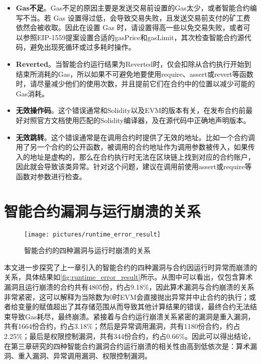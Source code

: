 \begin{itemize}
    \item \textbf{Gas不足}。Gas不足的原因主要是发送交易前设置的Gas太少，或者智能合约编写不当。若 Gas 设置得过低，会导致交易失败，且发送交易前支付的矿工费依然会被收取。因此在设置 Gas 时，请设置得高一些以免交易失败，或者可以参照EIP-1559提案\cite{EIP1559}设置合适的gasPrice和gasLimit，其次检查智能合约源代码，避免出现死循环或过多耗时操作。
    \item \textbf{Reverted}。当智能合约运行结果为Reverted时，仅会扣除从合约执行开始到结束所消耗的Gas，所以如果不可避免地要使用require、assert或revert等函数时，请尽量减少他们的使用次数，并且提前它们在合约中的位置以减少可能的Gas消耗。
    \item \textbf{无效操作码}。这个错误通常和Solidity以及EVM的版本有关，在发布合约前最好对照官方文档使用匹配的Solidity编译器，及在源代码中正确地声明版本。
    \item \textbf{无效跳转}。这个错误通常是在调用合约时提供了无效的地址。比如一个合约调用了另一个合约的公开函数，被调用的合约地址作为调用参数被传入，如果传入的地址是虚构的，那么在合约执行时无法在区块链上找到对应的合约账户，因此就会导致该类异常。针对这个问题，建议在调用前使用assert或require等函数对参数进行检查。
\end{itemize}

\section{智能合约漏洞与运行崩溃的关系}
\begin{figure}[htbp]
    \centering
    \texttt{[image: pictures/runtime\_error\_result]}
    \caption{\label{fig:runtime_error_result}智能合约的四种漏洞与运行时崩溃的关系}
\end{figure}

本文进一步探究了上一章引入的智能合约的四种漏洞与合约因运行时异常而崩溃的关系，具体结果如\autoref{fig:runtime_error_result}所示。从图中可以看出，仅包含算术漏洞且运行崩溃的合约共有4805份，约占9.18\%，因此算术漏洞与合约崩溃的关系非常紧密，这可以解释为当除数为0时EVM会直接抛出异常并中止合约的执行；或者给变量的赋值超出了其存储范围从而导致其他计算结果的错误，最终合约无法结束导致Gas耗尽，最终崩溃。紧接着与合约运行崩溃关系紧密的漏洞是重入漏洞，共有1664份合约，约占3.18\%；然后是异常调用漏洞，共有1180份合约，约占2.25\%；最后是权限控制漏洞，共有344份合约，约占0.66\%。因此可以得出结论，在第三章研究的四种智能合约漏洞合约运行崩溃的相关性由高到低依次是：算术漏洞、重入漏洞、异常调用漏洞、权限控制漏洞。


